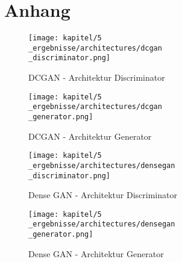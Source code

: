 \chapter{Anhang}

\begin{figure}[H]
	\centering
	\texttt{[image: kapitel/5\\\_ergebnisse/architectures/dcgan\\\_discriminator.png]}
	\caption{DCGAN - Architektur Discriminator}
	\label{architecture:dcgan-dis}
\end{figure}

\begin{figure}[H]
	\centering
	\texttt{[image: kapitel/5\\\_ergebnisse/architectures/dcgan\\\_generator.png]}
	\caption{DCGAN - Architektur Generator}
	\label{architecture:dcgan-gen}
\end{figure}

\begin{figure}[H]
	\centering
	\texttt{[image: kapitel/5\\\_ergebnisse/architectures/densegan\\\_discriminator.png]}
	\caption{Dense GAN - Architektur Discriminator}
	\label{architecture:densegan-dis}
\end{figure}

\begin{figure}[H]
	\centering
	\texttt{[image: kapitel/5\\\_ergebnisse/architectures/densegan\\\_generator.png]}
	\caption{Dense GAN - Architektur Generator}
	\label{architecture:densegan-gen}
\end{figure}